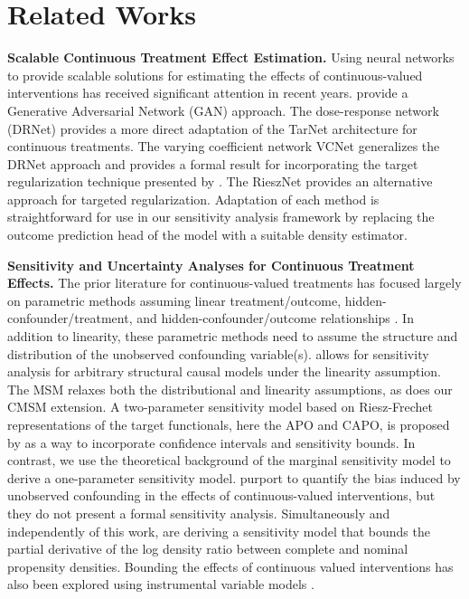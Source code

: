 \section{Related Works}
\textbf{Scalable Continuous Treatment Effect Estimation.}
Using neural networks to provide scalable solutions for estimating the effects of continuous-valued interventions has received significant attention in recent years. 
\cite{bica2020estimating} provide a Generative Adversarial Network (GAN) approach. 
The dose-response network (DRNet) \citep{schwab2020learning} provides a more direct adaptation of the TarNet \citep{shalit2017estimating} architecture for continuous treatments.
The varying coefficient network VCNet \citep{nie2021vcnet} generalizes the DRNet approach and provides a formal result for incorporating the target regularization technique presented by \cite{shi2019adapting}.
The RieszNet \citep{chernozhukov2021omitted} provides an alternative approach for targeted regularization.
Adaptation of each method is straightforward for use in our sensitivity analysis framework by replacing the outcome prediction head of the model with a suitable density estimator.

\textbf{Sensitivity and Uncertainty Analyses for Continuous Treatment Effects.}
The prior literature for continuous-valued treatments has focused largely on parametric methods assuming linear treatment/outcome, hidden-confounder/treatment, and hidden-confounder/outcome relationships \citep{carnegie2016assessing, dorie2016flexible, middleton2016bias, oster2019unobservable, cinelli2020making, cinelli2020omitted}. 
In addition to linearity, these parametric methods need to assume the structure and distribution of the unobserved confounding variable(s).
\cite{cinelli2019sensitivity} allows for sensitivity analysis for arbitrary structural causal models under the linearity assumption.
The MSM relaxes both the distributional and linearity assumptions, as does our CMSM extension. 
A two-parameter sensitivity model based on Riesz-Frechet representations of the target functionals, here the APO and CAPO, is proposed by \cite{chernozhukov2021omitted} as a way to incorporate confidence intervals and sensitivity bounds.
In contrast, we use the theoretical background of the marginal sensitivity model to derive a one-parameter sensitivity model.
\cite{detommaso2021causal} purport to quantify the bias induced by unobserved confounding in the effects of continuous-valued interventions, but they do not present a formal sensitivity analysis.
Simultaneously and independently of this work, \cite{marmarelisbounding} are deriving a sensitivity model that bounds the partial derivative of the log density ratio between complete and nominal propensity densities. 
Bounding the effects of continuous valued interventions has also been explored using instrumental variable models \citep{kilbertus2020aclass, hu2021generative, padh2022stochastic}.
